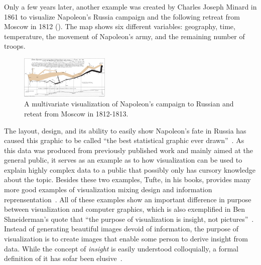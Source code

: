
Only a few years later, another example was created by Charles Joseph Minard in 1861 to visualize Napoleon's Russia campaign and the following retreat from Moscow in 1812 ().  The map shows six different variables: geography, time, temperature, the movement of Napoleon's army, and the remaining number of troops.
\begin{figure}
    \includegraphics[width=0.38\textwidth]{figures/motivation/napoleon.png}
    \caption{A multivariate visualization of Napoleon's campaign to Russian and reteat from Moscow in 1812-1813.}
    \label{fig:motivation:example:napoleon}
\end{figure}
\noindent The layout, design, and its ability to easily show Napoleon's fate in Russia has caused this graphic to be called ``the best statistical graphic ever drawn''~\cite{tufte1983visual}.  As this data was produced from previously published work and mainly aimed at the general public, it serves as an example as to how visualization can be used to explain highly complex data to a public that possibly only has cursory knowledge about the topic.  Besides these two examples, Tufte, in his books, provides many more good examples of visualization mixing design and information reprensentation~\cite{tufte1991envisioning}.  All of these examples show an important difference in purpose between visualization and computer graphics, which is also exemplified in Ben Shneiderman's quote that ``the purpose of visualization is insight, not pictures''~\cite{card1999readings}.  Instead of generating beautiful images devoid of information, the purpose of visualization is to create images that enable some person to derive insight from data.  While the concept of \emph{insight} is easily understood colloquially, a formal definition of it has sofar been elusive~\cite{north2006toward}.

